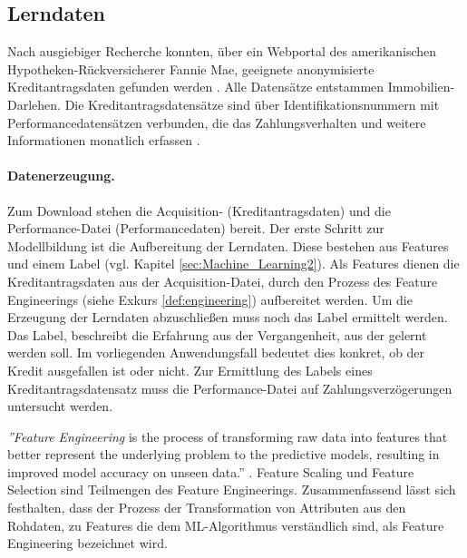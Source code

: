 \subsection{Lerndaten}
\label{subsec:Lerndaten31}

Nach ausgiebiger Recherche konnten, über ein Webportal des amerikanischen Hypotheken-Rückversicherer Fannie Mae, geeignete anonymisierte Kreditantragsdaten gefunden werden \cite{FM17}. Alle Datensätze entstammen Immobilien-Darlehen. Die Kreditantragsdatensätze sind über Identifikationsnummern mit Performancedatensätzen verbunden, die das Zahlungsverhalten und weitere Informationen monatlich erfassen \cite{FM18}. 

\paragraph{Datenerzeugung.} Zum Download stehen die Acquisition- (Kreditantragsdaten) und die Performance-Datei (Performancedaten) bereit. Der erste Schritt zur Modellbildung ist die Aufbereitung der Lerndaten. Diese bestehen aus Features und einem Label (vgl. Kapitel \ref{sec:Machine_Learning2}). Als Features dienen die Kreditantragsdaten aus der Acquisition-Datei, durch den Prozess des Feature Engineerings (siehe Exkurs \ref{def:engineering}) aufbereitet werden. Um die Erzeugung der Lerndaten abzuschließen muss noch das Label ermittelt werden. Das Label, beschreibt die Erfahrung aus der Vergangenheit, aus der gelernt werden soll. Im vorliegenden Anwendungsfall bedeutet dies konkret, ob der Kredit ausgefallen ist oder nicht. Zur Ermittlung des Labels eines Kreditantragsdatensatz muss die Performance-Datei auf Zahlungsverzögerungen untersucht werden. 

\begin{definition}
\begin{shaded}
\emph{''Feature Engineering} is the process of transforming raw data into features that better represent the underlying problem to the predictive models, resulting in improved model accuracy on unseen data.'' \cite{MM17}. Feature Scaling und Feature Selection sind Teilmengen des Feature Engineerings. Zusammenfassend lässt sich festhalten, dass der Prozess der Transformation von Attributen aus den Rohdaten, zu Features die dem ML-Algorithmus verständlich sind, als Feature Engineering bezeichnet wird. 
\label{def:engineering}
\end{shaded}
\end{definition}

